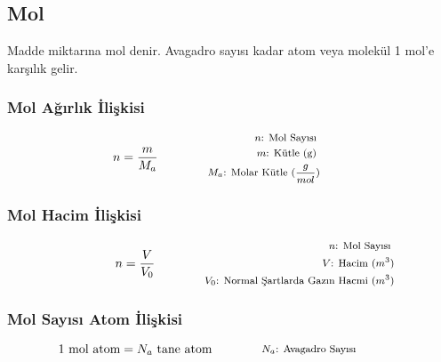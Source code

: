 \subsection{Mol}

Madde miktarına mol denir. Avagadro sayısı kadar atom veya molekül 1 mol'e karşılık gelir.

\subsubsection*{Mol Ağırlık İlişkisi}
\begin{equation}
    n = \frac{m}{M_a} \qquad \qquad \parbox{4cm}{\footnotesize$\begin{aligned}
        n\text{: Mol Sayısı } \\
        m\text{: Kütle (g) } \\
        M_a\text{: Molar Kütle (} \frac{g}{mol} \text{)} \\
\end{aligned}$}
\end{equation}

\subsubsection*{Mol Hacim İlişkisi}
\begin{equation}
    n = \frac{V}{V_0} \qquad \qquad \parbox{4cm}{\footnotesize$\begin{aligned}
        n\text{: Mol Sayısı }\\
        V\text{: Hacim } (m^3) \\
        V_0\text{: Normal Şartlarda Gazın Hacmi } (m^3)
\end{aligned}$}
\end{equation}

\subsubsection*{Mol Sayısı Atom İlişkisi}
\begin{equation}
    1 \textrm{ mol atom} = N_a \textrm{ tane atom} \qquad \qquad \parbox{4cm}{\footnotesize$\begin{aligned}
        N_a\text{: Avagadro Sayısı }
\end{aligned}$}
\end{equation}